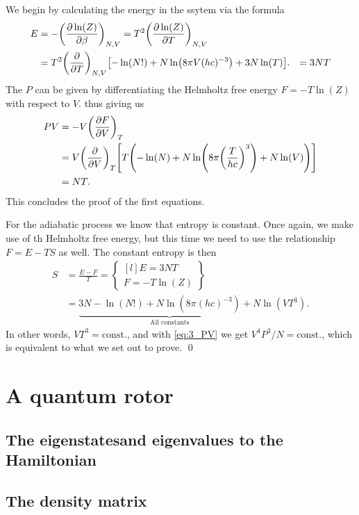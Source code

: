 \documentclass[11pt,letter, swedish, english
]{article}
\begin{document}
We begin by calculating the energy in the ssytem via the formula
\begin{equation}\label{eq:3_E}
\begin{aligned}
E&=-\qty(\pdv{\ln(Z)}{\beta})_{N,V}=T^2\qty(\pdv{\ln(Z)}{T})_{N,V}\\
&=T^2\qty(\pdv{T})_{N,V}\qty[-\ln(N!)+N\ln(8\pi V (hc)^{-3})+3N\ln(T)].
&=3NT
\end{aligned}
\end{equation}
The $P$ can be given by differentiating the Helmholtz free energy
$F=-T\ln(Z)$ with respect to $V$.
thus giving us
\begin{equation}\label{eq:3_PV}
\begin{aligned}
PV&=-V\qty(\pdv{F}{V})_{T}\\
&=V\qty(\pdv{V})_{T}
\qty[T\qty(-\ln(N)+N\ln(8\pi\qty(\frac{T}{hc})^3) + N\ln(V))]\\
&=NT.
\end{aligned}
\end{equation}
This concludes the proof of the first equations.

For the adiabatic process we know that entropy is constant. Once again,
we make use of th Helmholtz free energy, but this time we need to use
the relationship $F=E-TS$ as well. The constant entropy is then
\begin{equation}
\begin{aligned}
S&=\frac{E-F}{T}=\begin{Bmatrix*}[l]
E=3NT\\F=-T\ln(Z)
\end{Bmatrix*}\\
&=\underbrace{3N-\ln(N!) +N\ln(8\pi(hc)^{-3})+N}_\text{All constants}
\ln(VT^3).
\end{aligned}
\end{equation}
In other words, $VT^3=\text{const.}$, and with \eqref{eq:3_PV} we get
$V^4P^3/N=\text{const.}$, which is equivalent to what we set out to
prove. 
\qed


\section{A quantum rotor}

\subsection{The eigenstatesand eigenvalues to the Hamiltonian}


\subsection{The density matrix}
\end{document}
